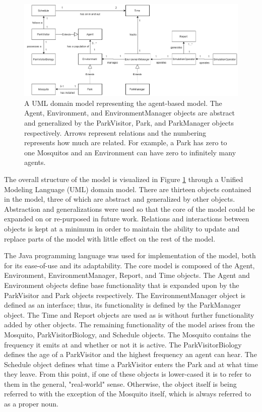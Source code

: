 \documentclass[twocolumn,11pt]{article}
\begin{document}
\begin{figure}[h]
    \centering
    \includegraphics[width=1.0\textwidth]{umldomain.png}
    \caption{A UML domain model representing the agent-based model. The Agent, Environment, and EnvironmentManager objects are abstract and generalized by the ParkVisitor, Park, and ParkManager objects respectively. Arrows represent relations and the numbering represents how much are related. For example, a Park has zero to one Mosquitos and an Environment can have zero to infinitely many agents.}
    \label{fig:domain}
\end{figure}

The overall structure of the model is visualized in Figure \ref{fig:domain} through a Unified Modeling Language (UML) domain model. There are thirteen objects contained in the model, three of which are abstract and generalized by other objects. Abstraction and generalizations were used so that the core of the model could be expanded on or re-purposed in future work. Relations and interactions between objects is kept at a minimum in order to maintain the ability to update and replace parts of the model with little effect on the rest of the model.

The Java programming language was used for implementation of the model, both for its ease-of-use and its adaptability. The core model is composed of the Agent, Environment, EnvironmentManager, Report, and Time objects. The Agent and Environment objects define base functionality that is expanded upon by the ParkVisitor and Park objects respectively. The EnvironmentManager object is defined as an interface; thus, its functionality is defined by the ParkManager object. The Time and Report objects are used as is without further functionality added by other objects. The remaining functionality of the model arises from the Mosquito, ParkVisitorBiology, and Schedule objects. The Mosquito contains the frequency it emits at and whether or not it is active. The ParkVisitorBiology defines the age of a ParkVisitor and the highest frequency an agent can hear. The Schedule object defines what time a ParkVisitor enters the Park and at what time they leave. From this point, if one of these objects is lower-cased it is to refer to them in the general, "real-world" sense. Otherwise, the object itself is being referred to with the exception of the Mosquito itself, which is always referred to as a proper noun.
\end{document}
